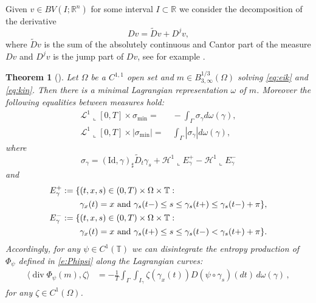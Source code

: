 \documentclass[fleqn
]{article}
\numberwithin{equation}{section}
\newcommand{\R}{{\mathbb R}}
\newcommand{\T}{{\mathbb T}}
\renewcommand{\L}{{\mathcal L}}
\DeclareMathOperator{\dv}{div}
\newtheorem{thm}{Theorem}[section]
\theoremstyle{definition}
\begin{document}
Given $v \in BV(I;\R^n)$ for some interval $I\subset \R$ we consider the decomposition of the derivative
\[
Dv = \tilde D v + D^j v,
\]
where $\tilde D v$ is the sum of the absolutely continuous and Cantor part of the measure $Dv$ and $D^jv$ is the jump part of $Dv$, see for example \cite{ambrosio}.


\begin{thm}
[\cite{marconi21micromag,marconi21ellipse}]
\label{t:lagr}
Let $\Omega$ be a $C^{1,1}$ open set and $m \in B^{1/3}_{3,\infty}(\Omega)$ solving \eqref{eq:eik} and \eqref{eq:kin}. Then there is a minimal Lagrangian representation $\omega$ of $m$. Moreover the following equalities between measures hold:
\begin{equation}\label{e:kin-lagr}
\begin{split}
\L^1\llcorner [0,T] \times \sigma_{\min} = &~ - \int_\Gamma \sigma_\gamma d\omega(\gamma), \\
\L^1\llcorner [0,T] \times |\sigma_{\min}| = &~ \int_\Gamma |\sigma_\gamma| d\omega(\gamma),
\end{split}
\end{equation}
where 
\begin{equation}\label{e:def-sigma-gamma}
\sigma_\gamma = (\mathrm{Id}, \gamma)_\sharp  \tilde D_t \gamma_s + \mathcal H^1\llcorner E_{\gamma}^+ -\mathcal H^1\llcorner E_{\gamma}^-
\end{equation}
and
\begin{equation}\label{E_def_Epmgamma}
\begin{split}
E_\gamma^+ &:= 
\{(t,x,s) \in (0,T)\times \Omega\times \T: 
\\
&\hspace{2.1em}
\gamma_x(t)=x 
 \mbox{ and } \gamma_s(t-)\le s \le \gamma_s(t+)\le \gamma_s(t-)+\pi \}, \\
E_\gamma^- & := \{(t,x,s) \in (0,T)\times \Omega\times \T:
\\
&\hspace{2.1em} \gamma_x(t)=x  \mbox{ and } \gamma_s(t+)\le s \le \gamma_s(t-)< \gamma_s(t+)+\pi \}.
\end{split}
\end{equation}
Accordingly, for any $\psi \in C^1(\T)$ we can disintegrate the entropy production of $\Phi_\psi$ defined in \eqref{e:Phipsi} along the Lagrangian curves:
\begin{align}\label{e:repr_entr}
\langle \dv\Phi_\psi(m),\zeta\rangle
&
=-\frac1T\int_{\Gamma}  \int_{I_\gamma}\zeta(\gamma_x(t))D(\psi\circ\gamma_s)(dt)\, d\omega(\gamma)\,,
\end{align}
for any $\zeta\in C^1(\Omega)$.
\end{thm}
\end{document}
